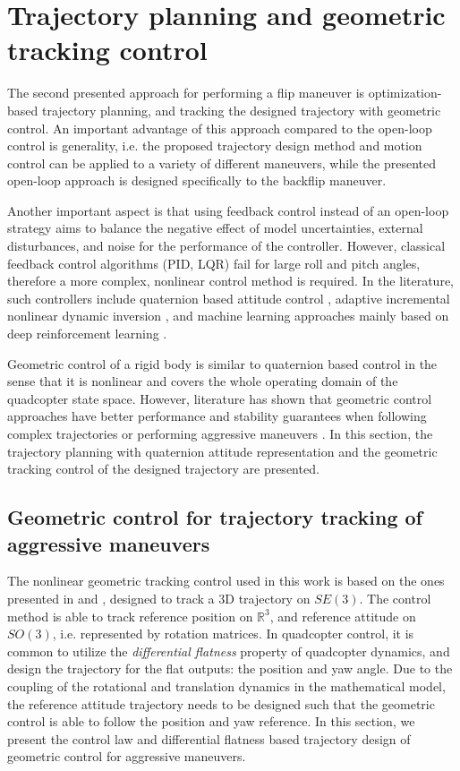 \section{Trajectory planning and geometric tracking control}

The second presented approach for performing a flip maneuver is optimization-based trajectory planning, and tracking the designed trajectory with geometric control. An important advantage of this approach compared to the open-loop control is generality, i.e. the proposed trajectory design method and motion control can be applied to a variety of different maneuvers, while the presented open-loop approach is designed specifically to the backflip maneuver.

Another important aspect is that using feedback control instead of an open-loop strategy aims to balance the negative effect of model uncertainties, external disturbances, and noise for the performance of the controller. However, classical feedback control algorithms (PID, LQR) fail for large roll and pitch angles, therefore a more complex, nonlinear control method is required. In the literature, such controllers include quaternion based attitude control \cite{quaternion}, adaptive incremental nonlinear dynamic inversion \cite{indi2015}, and machine learning approaches mainly based on deep reinforcement learning \cite{drone-racing-deep-rl,deep_acrobatics, quadrotor-control-rl}. 

Geometric control of a rigid body is similar to quaternion based control in the sense that it is nonlinear and covers the whole operating domain of the quadcopter state space. However, literature has shown that geometric control approaches have better performance and stability guarantees when following complex trajectories or performing aggressive maneuvers \cite{lelemc2010, turpinkumar2011, mellinger2011}. In this section, the trajectory planning with quaternion attitude representation and the geometric tracking control of the designed trajectory are presented.

\subsection{Geometric control for trajectory tracking of aggressive maneuvers}
The nonlinear geometric tracking control used in this work is based on the ones presented in \cite{lelemc2010} and \cite{turpinkumar2011}, designed to track a 3D trajectory on $SE(3)$. The control method is able to track reference position on $\mathbb{R}^3$, and reference attitude on $SO(3)$, i.e. represented by rotation matrices. In quadcopter control, it is common to utilize the \textit{differential flatness} property of quadcopter dynamics, and design the trajectory for the flat outputs: the position and yaw angle. Due to the coupling of the rotational and translation dynamics in the mathematical model, the reference attitude trajectory needs to be designed such that the geometric control is able to follow the position and yaw reference. In this section, we present the control law and differential flatness based trajectory design of geometric control for aggressive maneuvers.

